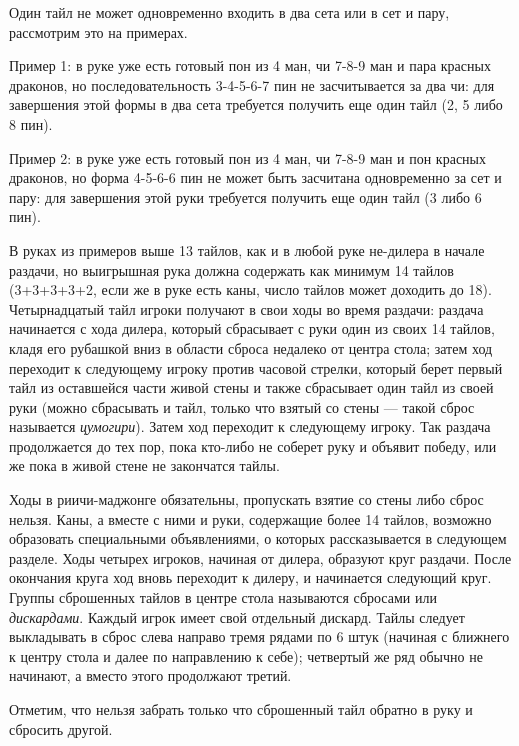 Один тайл не может одновременно входить в два сета или в сет и пару, рассмотрим это на примерах.

Пример 1: в руке уже есть готовый пон из 4 ман, чи 7-8-9 ман и пара красных драконов, но последовательность 3-4-5-6-7 пин не засчитывается за два чи: для завершения этой формы в два сета требуется получить еще один тайл (2, 5 либо 8 пин).


Пример 2: в руке уже есть готовый пон из 4 ман, чи 7-8-9 ман и пон красных драконов, но форма 4-5-6-6 пин не может быть засчитана одновременно за сет и пару: для завершения этой руки требуется получить еще один тайл (3 либо 6 пин).


В руках из примеров выше 13 тайлов, как и в любой руке не-дилера в начале раздачи, но выигрышная рука должна содержать как минимум 14 тайлов (3+3+3+3+2, если же в руке есть каны, число тайлов может доходить до 18). Четырнадцатый тайл игроки получают в свои ходы во время раздачи: раздача начинается с хода дилера, который сбрасывает с руки один из своих 14 тайлов, кладя его рубашкой вниз в области сброса недалеко от центра стола; затем ход переходит к следующему игроку против часовой стрелки, который берет первый тайл из оставшейся части живой стены и также сбрасывает один тайл из своей руки (можно сбрасывать и тайл, только что взятый со стены --- такой сброс называется \textit{цумогири}). Затем ход переходит к следующему игроку. Так раздача продолжается до тех пор, пока кто-либо не соберет руку и объявит победу, или же пока в живой стене не закончатся тайлы. 

Ходы в риичи-маджонге обязательны, пропускать взятие со стены либо сброс нельзя. Каны, а вместе с ними и руки, содержащие более 14 тайлов, возможно образовать специальными объявлениями, о которых рассказывается в следующем разделе. Ходы четырех игроков, начиная от дилера, образуют круг раздачи. После окончания круга ход вновь переходит к дилеру, и начинается следующий круг. Группы сброшенных тайлов в центре стола называются сбросами или \textit{дискардами}. Каждый игрок имеет свой отдельный дискард. Тайлы следует выкладывать в сброс слева направо тремя рядами по 6 штук (начиная с ближнего к центру стола и далее по направлению к себе); четвертый же ряд обычно не начинают, а вместо этого продолжают третий.

Отметим, что нельзя забрать только что сброшенный тайл обратно в руку и сбросить другой.

